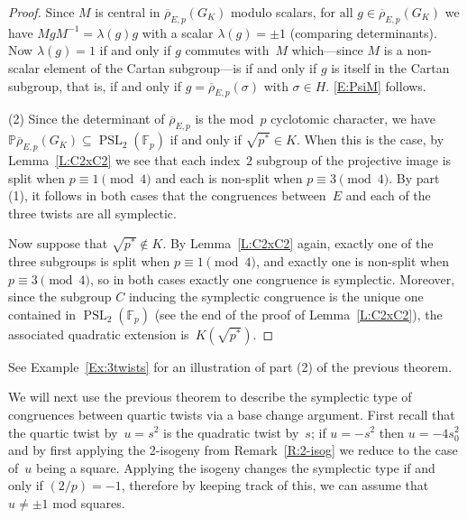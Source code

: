 \documentclass[12pt, reqno]{amsart}
\newcommand{\F}{\mathbb{F}}
\newcommand{\PP}{\mathbb{P}}
\newcommand{\rhobar}{{\overline{\rho}}}
\newcommand{\PSL}{\operatorname{PSL}}
\numberwithin{equation}{section}
\theoremstyle{definition}
\theoremstyle{remark}
\newcommand{\nf}[1]{{\color{blue} \textsf{[NF: #1]}}}
\newcommand{\jc}[1]{{\color{darkgreen} \textsf{[JC: #1]}}}
\begin{document}
\begin{proof}
Since $M$ is central in $\rhobar_{E,p}(G_K)$ modulo scalars, for all
$g\in\rhobar_{E,p}(G_K)$ we have $MgM^{-1}=\lambda(g)g$ with a scalar
$\lambda(g)=\pm1$ (comparing determinants).  Now $\lambda(g)=1$ if and
only if $g$ commutes with~$M$ which---since $M$ is a non-scalar element
of the Cartan subgroup---is if and only if $g$ is itself in the Cartan
subgroup, that is, if and only if $g=\rhobar_{E,p}(\sigma)$ with
$\sigma\in H$.  \eqref{E:PsiM} follows.

\begin{comment}
\jc{In your proof you start with $M$ defining a non-trivial twist,
  hence satisfying \eqref{E:PsiM}, and show that it has order 2 mod
  scalars.  In my proof I take an $M$ of order $2$ mod scalars and
  show that it satisfies \eqref{E:PsiM} and so defines a isomorphism
  between the twists.  I prefer not to have to write down explicit
  matrices in the Cartan: it seems dangerous to me as we have already
  chosen bases of $E[p]$ and $E'[p]$, but it is OK since after (4.1)
  you start with any basis of $E[p]$.}
  
  \nf{It is OK to delete my proof if your prefer to go matrix free.}
\end{comment}

(2) Since the determinant of $\rhobar_{E,p}$ is the mod~$p$ cyclotomic
character, we have $\PP\rhobar_{E,p}(G_K)\subseteq \PSL_2(\F_p)$ if
and only if $\sqrt{p^*}\in K$.  When this is the case, by
Lemma~\ref{L:C2xC2} we see that each index~$2$ subgroup of the
projective image is split when $p\equiv1\pmod4$ and each is non-split
when $p\equiv3\pmod4$.  By part (1), it follows in both cases that the
congruences between~$E$ and each of the three twists are all
symplectic.

Now suppose that $\sqrt{p^*}\notin K$.  By Lemma~\ref{L:C2xC2} again,
exactly one of the three subgroups is split when $p\equiv1\pmod4$, and
exactly one is non-split when $p\equiv3\pmod4$, so in both cases
exactly one congruence is symplectic.  Moreover, since the subgroup
$C$ inducing the symplectic congruence is the unique one contained in
$\PSL_2(\F_p)$ (see the end of the proof of Lemma~\ref{L:C2xC2}), the
associated quadratic extension is~$K(\sqrt{p^*})$.
\end{proof}

See Example~\ref{Ex:3twists} for an illustration of part (2) of
the previous theorem.


We will next use the previous theorem to describe the symplectic type
of congruences between quartic twists via a base change
argument. First recall that the quartic twist by~$u = s^2$ is the
quadratic twist by~$s$; if $u = -s^2$ then $u = -4s_0^2$ and by first
applying the 2-isogeny from Remark~\ref{R:2-isog} we reduce to the
case of~$u$ being a square. Applying the isogeny changes the
symplectic type if and only if $(2/p) = -1$, therefore by keeping
track of this, we can assume that $u \neq \pm 1$ mod squares.
\end{document}
